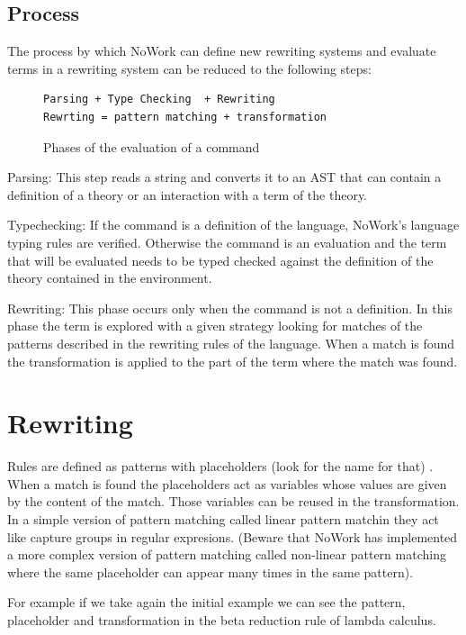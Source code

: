 \documentclass[12pt,a4paper]{article}
\begin{document}
\subsection{Process}

The process by which NoWork can define new rewriting systems and
evaluate terms in a rewriting system can be reduced to the following steps:

\begin{figure}[!h]
\begin{verbatim}
Parsing + Type Checking  + Rewriting
Rewrting = pattern matching + transformation
\end{verbatim}
\caption{ Phases of the evaluation of a command }
\end{figure}

Parsing: This step reads a string and converts it to an AST that
can contain a definition of a theory or an interaction with a term
of the theory.

Typechecking: If the command is a definition of the language, NoWork's
language typing rules are verified. Otherwise the command is an evaluation 
and the term that will be evaluated needs to be typed checked against the definition of
the theory contained in the environment.

Rewriting: This phase occurs only when the command is not a definition. 
In this phase the term is explored with a
given strategy looking for matches of the patterns described in the
rewriting rules of the language. When a match is found the
transformation is applied to the part of the term where the match
was found.

\section{Rewriting}

Rules are defined as patterns with placeholders (look for the name for
that) . When a match is found the placeholders act as variables whose
values are given by the content of the match. Those variables can be
reused in the transformation. In a simple version of pattern matching
called linear pattern matchin they act like capture groups in regular
expresions. (Beware that NoWork has implemented a more complex version of
pattern matching called non-linear pattern matching where the same
placeholder can appear many times in the same pattern).

For example if we take again the initial example we can see the
pattern, placeholder and transformation in the beta reduction rule of 
lambda calculus.
\end{document}
